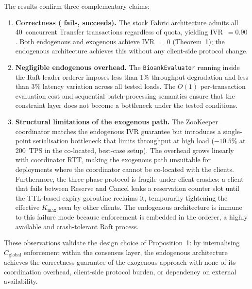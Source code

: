 The results confirm three complementary claims:

\begin{enumerate}
  \item \textbf{Correctness ( fails,  succeeds).}
    The stock Fabric architecture admits all 40~concurrent Transfer transactions
    regardless of quota, yielding IVR~$= 0.90$.  Both endogenous and exogenous
     achieve IVR~$= 0$ (Theorem~1); the endogenous architecture
    achieves this without any client-side protocol change.

  \item \textbf{Negligible endogenous overhead.}
    The \texttt{BioankEvaluator} running inside the Raft leader orderer imposes
    less than 1\% throughput degradation and less than 3\% latency variation
    across all tested loads.  The $O(1)$ per-transaction evaluation cost and
    sequential batch-processing semantics ensure that the constraint layer does
    not become a bottleneck under the tested conditions.

  \item \textbf{Structural limitations of the exogenous path.}
    The ZooKeeper coordinator matches the endogenous IVR guarantee but introduces
    a single-point serialisation bottleneck that limits throughput at high load
    ($-10.5$\% at 200~TPS in the co-located, best-case setup).  The overhead
    grows linearly with coordinator RTT, making the exogenous path unsuitable for
    deployments where the coordinator cannot be co-located with the clients.
    Furthermore, the three-phase protocol is fragile under client crashes: a
    client that fails between Reserve and Cancel leaks a reservation counter slot
    until the TTL-based expiry goroutine reclaims it, temporarily tightening the
    effective $K_\text{max}$ seen by other clients.  The endogenous architecture
    is immune to this failure mode because enforcement is embedded in the orderer,
    a highly available and crash-tolerant Raft process.
\end{enumerate}

These observations validate the design choice of Proposition~1: by internalising
$C_\text{global}$ enforcement within the consensus layer, the endogenous
architecture achieves the correctness guarantee of the exogenous approach with
none of its coordination overhead, client-side protocol burden, or dependency on
external availability.

